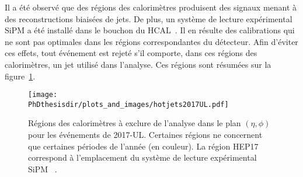 \par Il a été observé que des régions des calorimètres produisent des signaux menant à des reconstructions biaisées de jets.
De plus, un système de lecture expérimental \og SiPM \fg{} a été installé dans le bouchon du HCAL~\cite{SiPM_CMS_conf}.
Il en résulte des calibrations qui ne sont pas optimales dans les régions correspondantes du détecteur.
Afin d'éviter ces effets, tout événement est rejeté s'il comporte, dans ces régions des calorimètres, un jet utilisé dans l'analyse.
Ces régions sont résumées sur la figure~\ref{fig-hotjets2017UL}.
\begin{figure}[h]
\centering
\texttt{[image: \\PhDthesisdir/plots\_and\_images/hotjets2017UL.pdf]}
\caption[Régions des calorimètres à exclure de l'analyse dans le plan $(\eta, \phi)$.]{Régions des calorimètres à exclure de l'analyse dans le plan $(\eta, \phi)$ pour les événements de 2017-UL. Certaines régions ne concernent que certaines périodes de l'année (en couleur). La région \og HEP17 \fg{} correspond à l'emplacement du système de lecture expérimental \og SiPM \fg~\cite{SiPM_CMS_conf}.}
\label{fig-hotjets2017UL}
\end{figure}
%
%
%
